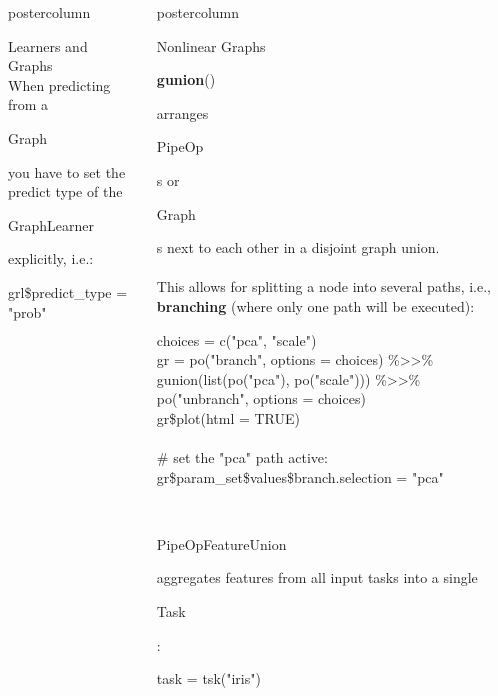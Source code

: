 \documentclass{beamer}
\newlength{\columnheight} %
\newcommand{\codeinline}[1]{\begin{codeboxinline}#1\end{codeboxinline}}
\begin{document}
\begin{frame}[fragile]{}
\begin{columns}
\begin{column}{.245\textwidth}
\begin{beamercolorbox}[center]{postercolumn}
\begin{minipage}{.98\textwidth}
{\begin{myblock}{Learners and Graphs}
              \ \\
              When predicting from a \codeinline{Graph} you have to set the predict type of the \codeinline{GraphLearner} explicitly, i.e.:
              \begin{codebox}
                grl\$predict\_type = "prob"
              \end{codebox}
            \end{myblock}
						\vfill}
				\end{minipage}
			\end{beamercolorbox}
		\end{column}
		\begin{column}{.245\textwidth}
			\begin{beamercolorbox}[center]{postercolumn}
				\begin{minipage}{.98\textwidth}
					\parbox[t][\columnheight]{\textwidth}{
            \begin{myblock}{Nonlinear Graphs}
              \codeinline{\textbf{gunion}()} arranges \codeinline{PipeOp}s or \codeinline{Graph}s next to each other in a disjoint graph union. \\
              \ \\
              This allows for splitting a node into several paths, i.e., \textbf{branching} (where only one path will be executed):
              \begin{codeboxexample}
						    {\footnotesize
                  choices = c("pca", "scale")\\
                  gr = po("branch", options = choices) \%>>\%\\
                  \hspace*{1ex} gunion(list(po("pca"), po("scale"))) \%>>\%\\
                  \hspace*{1ex} po("unbranch", options = choices)\\
                  gr\$plot(html = TRUE)\\
                  \ \\
                  \# set the "pca" path active:
                  gr\$param\_set\$values\$branch.selection = "pca"}
					      \end{codeboxexample}
              \ \\
              \codeinline{PipeOpFeatureUnion} aggregates features from all input tasks into a single \codeinline{Task}:
              \begin{codeboxexample}
						    {\footnotesize
                  task = tsk("iris")\\
}
\end{codeboxexample}
\end{myblock}}
\end{minipage}
\end{beamercolorbox}
\end{column}
\end{columns}
\end{frame}
\end{document}
